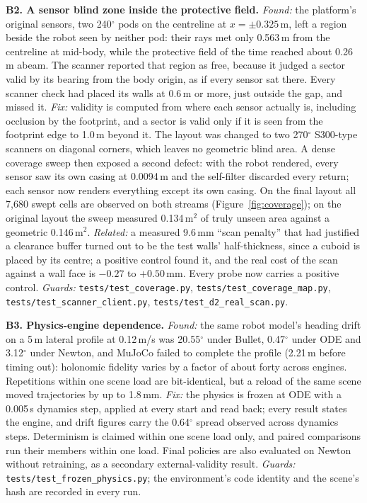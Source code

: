 \documentclass[sensors,article,submit,moreauthors]{Definitions/mdpi}
\begin{document}
\textbf{B2. A sensor blind zone inside the protective field.}
\emph{Found:} the platform's original sensors, two 240$^\circ$ pods on the centreline at $x = \pm 0.325$\,m, left a region beside the robot seen by neither pod: their rays met only 0.563\,m from the centreline at mid-body, while the protective field of the time reached about 0.26\,m abeam. The scanner reported that region as free, because it judged a sector valid by its bearing from the body origin, as if every sensor sat there. Every scanner check had placed its walls at 0.6\,m or more, just outside the gap, and missed it.
\emph{Fix:} validity is computed from where each sensor actually is, including occlusion by the footprint, and a sector is valid only if it is seen from the footprint edge to 1.0\,m beyond it. The layout was changed to two 270$^\circ$ S300-type scanners on diagonal corners, which leaves no geometric blind area. A dense coverage sweep then exposed a second defect: with the robot rendered, every sensor saw its own casing at 0.0094\,m and the self-filter discarded every return; each sensor now renders everything except its own casing. On the final layout all 7{,}680 swept cells are observed on both streams (Figure~\ref{fig:coverage}); on the original layout the sweep measured 0.134\,m$^2$ of truly unseen area against a geometric 0.146\,m$^2$.
\emph{Related:} a measured 9.6\,mm ``scan penalty'' that had justified a clearance buffer turned out to be the test walls' half-thickness, since a cuboid is placed by its centre; a positive control found it, and the real cost of the scan against a wall face is $-0.27$ to $+0.50$\,mm. Every probe now carries a positive control.
\emph{Guards:} \texttt{tests/test\_coverage.py}, \texttt{tests/test\_coverage\_map.py}, \texttt{tests/test\_scanner\_client.py}, \texttt{tests/test\_d2\_real\_scan.py}.

\textbf{B3. Physics-engine dependence.}
\emph{Found:} the same robot model's heading drift on a 5\,m lateral profile at 0.12\,m/s was 20.55$^\circ$ under Bullet, 0.47$^\circ$ under ODE and 3.12$^\circ$ under Newton, and MuJoCo failed to complete the profile (2.21\,m before timing out): holonomic fidelity varies by a factor of about forty across engines. Repetitions within one scene load are bit-identical, but a reload of the same scene moved trajectories by up to 1.8\,mm.
\emph{Fix:} the physics is frozen at ODE with a 0.005\,s dynamics step, applied at every start and read back; every result states the engine, and drift figures carry the 0.64$^\circ$ spread observed across dynamics steps. Determinism is claimed within one scene load only, and paired comparisons run their members within one load. Final policies are also evaluated on Newton without retraining, as a secondary external-validity result.
\emph{Guards:} \texttt{tests/test\_frozen\_physics.py}; the environment's code identity and the scene's hash are recorded in every run.
\end{document}
